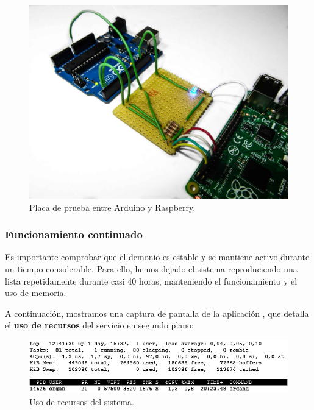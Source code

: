 \begin{figure}[H]
	\noindent \begin{centering}
		\includegraphics[width=\linewidth*3/4]{capitulo6/proto_uart}
		\par\end{centering}
	\smallskip
	\caption{\label{fig:proto_uart} Placa de prueba entre Arduino y Raspberry.}
\end{figure} 

\smallskip

\subsubsection{Funcionamiento continuado}

Es importante comprobar que el demonio es estable y se mantiene activo durante un tiempo considerable. Para ello, hemos dejado el sistema reproduciendo una lista repetidamente durante casi 40 horas, manteniendo el funcionamiento y el uso de memoria.

A continuación, mostramos una captura de pantalla de la aplicación , que detalla el \textbf{uso de recursos} del servicio en segundo plano:

\smallskip

\begin{figure}[H]
	\noindent \begin{centering}
		\includegraphics[width=\linewidth*3/4]{capitulo6/cap_top}
		\par\end{centering}
	\smallskip
	\caption{\label{fig:cap_top} Uso de recursos del sistema.}
\end{figure} 

